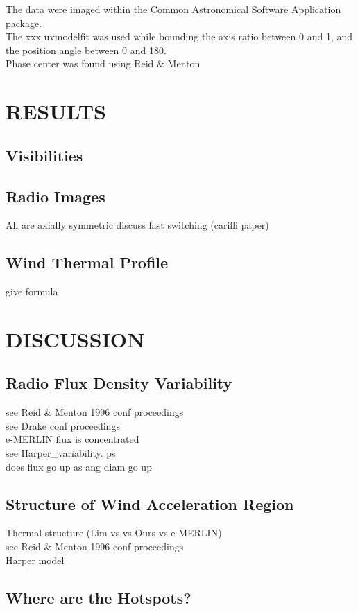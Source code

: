 \documentclass[iop]{emulateapj}
\begin{document}
The data were imaged within the Common Astronomical Software Application  \cite[CASA;][]{2007ASPC..376..127M} package.\\
The xxx uvmodelfit was used while bounding the axis ratio between 0 and 1, and the position angle between 0 and 180. \\
Phase center was found using Reid \& Menton\\

\section{RESULTS} 
\subsection{Visibilities} 
\subsection{Radio Images} 
All are axially symmetric
discuss fast switching (carilli paper)
\subsection{Wind Thermal Profile}
give formula 


\section{DISCUSSION}
\subsection{Radio Flux Density Variability} 
see Reid \& Menton 1996 conf proceedings\\
see Drake conf proceedings\\
e-MERLIN flux is concentrated\\
see Harper\_variability. ps\\
does flux go up as ang diam go up

\subsection{Structure of Wind Acceleration Region} 
Thermal structure (Lim vs vs Ours vs e-MERLIN)\\
see Reid \& Menton 1996 conf proceedings\\
Harper model

\subsection{Where are the Hotspots?}
\end{document}
